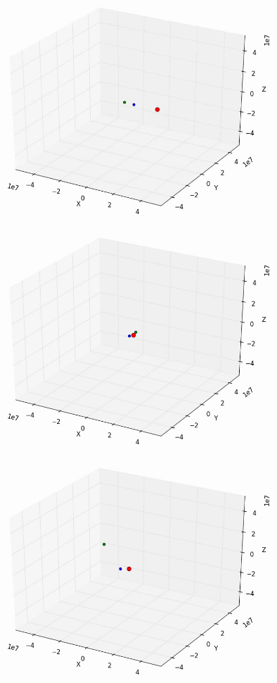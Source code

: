 \documentclass[10pt,letterpaper]{article}
\begin{document}
\begin{figure}[!htb]
  \includegraphics[width=\linewidth]{figures/three_body/6_1.png}
  \subcaption{}\label{fig:6_1}
\endminipage\hfill
{}
  \includegraphics[width=\linewidth]{figures/three_body/6_2.png}
  \subcaption{}\label{fig:6_2}
\endminipage\hfill
{}
  \includegraphics[width=\linewidth]{figures/three_body/6_3.png}

\end{figure}
\end{document}
